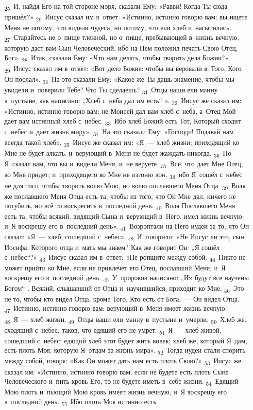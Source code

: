 \documentclass[a4paper,12pt]{article}
\begin{document}
\textsubscript{25}~И, найдя Его на той стороне моря, сказали Ему: «Равви! Когда Ты сюда пришёл?» \textsubscript{26}~Иисус сказал им в~ответ: «Истинно, истинно говорю вам: вы ищете Меня не потому, что видели чудеса, но потому, что ели хлеб и~насытились. \textsubscript{27}~Старайтесь не о~пище тленной, но о~пище, пребывающей в~жизнь вечную, которую даст вам Сын Человеческий, ибо на Нем положил печать Свою Отец, Бог». \textsubscript{28}~Итак, сказали Ему: «Что нам делать, чтобы творить дела Божии?» \textsubscript{29}~Иисус сказал им в~ответ: «Вот дело Божие: чтобы вы веровали в~Того, Кого Он послал». \textsubscript{30}~На это сказали Ему: «Какое же Ты дашь знамение, чтобы мы увидели и~поверили Тебе? Что Ты сделаешь? \textsubscript{31}~Отцы наши ели манну в~пустыне, как написано: „Хлеб с~неба дал им есть“ ». \textsubscript{32}~Иисус же сказал им: «Истинно, истинно говорю вам: не Моисей дал вам хлеб с~неба, а~Отец Мой дает вам истинный хлеб с~небес. \textsubscript{33}~Ибо хлеб Божий есть Тот, Который сходит с~небес и~дает жизнь миру». \textsubscript{34}~На это сказали Ему: «Господи! Подавай нам всегда такой хлеб». \textsubscript{35}~Иисус же сказал им: «Я~--- хлеб жизни; приходящий ко Мне не будет алкать, и~верующий в~Меня не будет жаждать никогда. \textsubscript{36}~Но Я~сказал вам, что вы и~видели Меня, и~не веруете. \textsubscript{37}~Все, что дает Мне Отец, ко Мне придет; и~приходящего ко Мне не изгоню вон, \textsubscript{38}~ибо Я~сошёл с~небес не для того, чтобы творить волю Мою, но волю пославшего Меня Отца. \textsubscript{39}~Воля же пославшего Меня Отца есть та, чтобы из того, что Он Мне дал, ничего не погубить, но всё то воскресить в~последний день. \textsubscript{40}~Воля Пославшего Меня есть та, чтобы всякий, видящий Сына и~верующий в~Него, имел жизнь вечную; и~Я воскрешу его в~последний день». \textsubscript{41}~Возроптали на Него иудеи за то, что Он сказал: «Я~--- хлеб, сошедший с~небес». \textsubscript{42}~И~говорили: «Не Иисус ли это, сын Иосифа, Которого отца и~мать мы знаем? Как же говорит Он: „Я сошёл с~небес“?» \textsubscript{43}~Иисус сказал им в~ответ: «Не ропщите между собой. \textsubscript{44}~Никто не может прийти ко Мне, если не привлечет его Отец, пославший Меня; и~Я воскрешу его в~последний день. \textsubscript{45}~У~пророков написано: „Иx будут все научены Богом“ . Всякий, слышавший от Отца и~научившийся, приходит ко Мне. \textsubscript{46}~Это не то, чтобы кто видел Отца, кроме Того, Кто есть от Бога,~--- Он видел Отца. \textsubscript{47}~Истинно, истинно говорю вам: верующий в~Меня имеет жизнь вечную. \textsubscript{48}~Я~— хлеб жизни. \textsubscript{49}~Отцы ваши ели манну в~пустыне и~умерли. \textsubscript{50}~Хлеб же, сходящий с~небес, таков, что едящий его не умрет. \textsubscript{51}~Я~— хлеб живой, сошедший с~небес; едящий хлеб этот будет жить вовек; хлеб же, который Я~дам, есть плоть Моя, которую Я~отдам за жизнь мира». \textsubscript{52}~Тогда иудеи стали спорить между собой, говоря: «Как Он может дать нам есть плоть Свою?» \textsubscript{53}~Иисус же сказал им: «Истинно, истинно говорю вам: если не будете есть плоть Сына Человеческого и~пить кровь Его, то не будете иметь в~себе жизни. \textsubscript{54}~Едящий Мою плоть и~пьющий Мою кровь имеет жизнь вечную, и~Я воскрешу его в~последний день. \textsubscript{55}~Ибо плоть Моя истинно есть 
\end{document}
